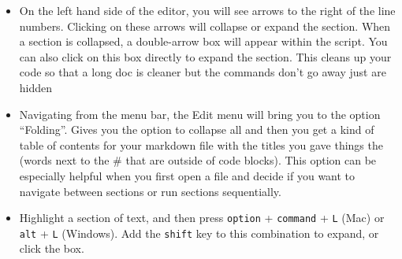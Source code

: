 \documentclass[
]{article}
\begin{document}
\begin{itemize}
\item
  On the left hand side of the editor, you will see arrows to the right
  of the line numbers. Clicking on these arrows will collapse or expand
  the section. When a section is collapsed, a double-arrow box will
  appear within the script. You can also click on this box directly to
  expand the section. This cleans up your code so that a long doc is
  cleaner but the commands don't go away just are hidden
\item
  Navigating from the menu bar, the Edit menu will bring you to the
  option ``Folding''. Gives you the option to collapse all and then you
  get a kind of table of contents for your markdown file with the titles
  you gave things the (words next to the \# that are outside of code
  blocks). This option can be especially helpful when you first open a
  file and decide if you want to navigate between sections or run
  sections sequentially.
\item
  Highlight a section of text, and then press \texttt{option} +
  \texttt{command} + \texttt{L} (Mac) or \texttt{alt} + \texttt{L}
  (Windows). Add the \texttt{shift} key to this combination to expand,
  or click the box.
\end{itemize}
\end{document}
